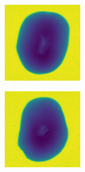 \documentclass[11pt]{article}
\begin{document}
\begin{figure}[!h]
\begin{subfigure}[b]{0.22\textwidth}
         \caption{}
         \label{fig:hollow_11}
     \end{subfigure}
          \\
    \begin{subfigure}[b]{0.22\textwidth}
         \centering
         \includegraphics[width=\textwidth]{figurer/potato_dataset/hollow/hollow_12.jpg}
         \caption{}
         \label{fig:hollow_12}
     \end{subfigure}
     \hfill
     \begin{subfigure}[b]{0.22\textwidth}
         \centering
         \includegraphics[width=\textwidth]{figurer/potato_dataset/hollow/hollow_13.jpg}

\end{subfigure}
\end{figure}
\end{document}
